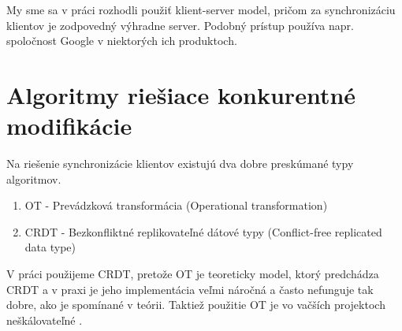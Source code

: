 My sme sa v práci rozhodli použiť klient-server model, pričom za synchronizáciu klientov
je zodpovedný výhradne server. Podobný prístup používa napr. spoločnost Google v 
niektorých ich produktoch.

\section{Algoritmy riešiace konkurentné modifikácie}
Na riešenie synchronizácie klientov existujú dva dobre preskúmané typy algoritmov.
\begin{enumerate}
  \item OT - Prevádzková transformácia (Operational transformation)
  \item CRDT - Bezkonfliktné replikovateľné dátové typy (Conflict-free replicated data type)
\end{enumerate}

V práci použijeme CRDT, pretože OT je teoreticky model, ktorý predchádza CRDT a v praxi
je jeho implementácia veľmi náročná a často nefunguje tak dobre, ako je spomínané v teórii.
Taktiež použitie OT je vo vačších projektoch neškálovateľné \cite{ot_nonscalable}. 
